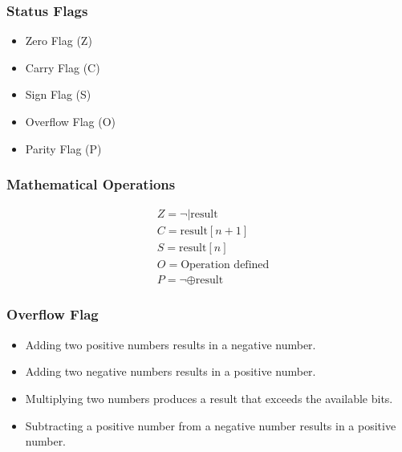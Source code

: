 \begin{frame}
    \frametitle{Status Flags}
    \begin{itemize}
        \item Zero Flag (Z)
        \item Carry Flag (C)
        \item Sign Flag (S)
        \item Overflow Flag (O)
        \item Parity Flag (P)
    \end{itemize}
\end{frame}

\begin{frame}
    \frametitle{Mathematical Operations}
    \begin{equation}
        \begin{aligned}
            &Z = \neg | \text{result} \\ 
            &C = \text{result}[n+1] \\ 
            &S = \text{result}[n] \\ 
            &O = \text{Operation defined} \\ 
            &P = \neg \oplus \text{result} 
        \end{aligned}
    \end{equation}
\end{frame}

\begin{frame}
    \frametitle{Overflow Flag}
    \begin{itemize}
        \item Adding two positive numbers results in a negative number.
        \item Adding two negative numbers results in a positive number.
        \item Multiplying two numbers produces a result that exceeds the available bits.
        \item Subtracting a positive number from a negative number results in a positive number.
    \end{itemize}
\end{frame}


